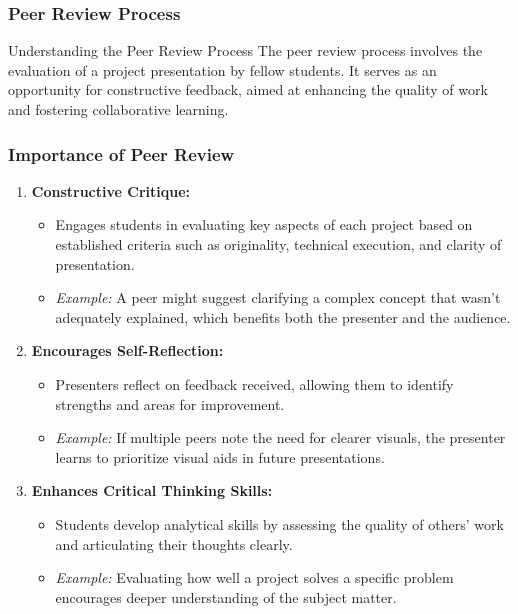 \documentclass[aspectratio=169]{beamer}
\begin{document}
\begin{frame}[fragile]
    \frametitle{Peer Review Process}
    \begin{block}{Understanding the Peer Review Process}
        The peer review process involves the evaluation of a project presentation by fellow students. It serves as an opportunity for constructive feedback, aimed at enhancing the quality of work and fostering collaborative learning.
    \end{block}
\end{frame}

\begin{frame}[fragile]
    \frametitle{Importance of Peer Review}
    \begin{enumerate}
        \item \textbf{Constructive Critique:}
        \begin{itemize}
            \item Engages students in evaluating key aspects of each project based on established criteria such as originality, technical execution, and clarity of presentation.
            \item \textit{Example:} A peer might suggest clarifying a complex concept that wasn't adequately explained, which benefits both the presenter and the audience.
        \end{itemize}
        
        \item \textbf{Encourages Self-Reflection:}
        \begin{itemize}
            \item Presenters reflect on feedback received, allowing them to identify strengths and areas for improvement.
            \item \textit{Example:} If multiple peers note the need for clearer visuals, the presenter learns to prioritize visual aids in future presentations.
        \end{itemize}

        \item \textbf{Enhances Critical Thinking Skills:}
        \begin{itemize}
            \item Students develop analytical skills by assessing the quality of others’ work and articulating their thoughts clearly.
            \item \textit{Example:} Evaluating how well a project solves a specific problem encourages deeper understanding of the subject matter.
        \end{itemize}


\end{enumerate}
\end{frame}
\end{document}
